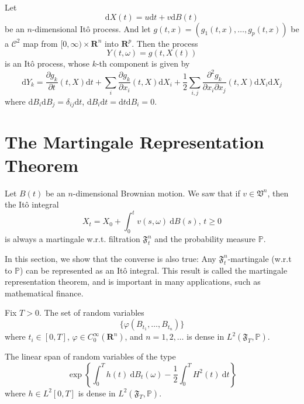 \begin{theorem}
    Let
    \[
        \mathrm{d}X(t) = u \mathrm{d}t + v \mathrm{d}B(t)
    \]
    be an $n$-dimensional Itô process. And let $g(t,x) = (g_1(t,x), \ldots, g_p(t,x))$ be a $\mathcal{C}^2$ map from $[0, \infty) \times \textbf{R}^n$ into $\textbf{R}^p$. Then the process 
    \[
        Y(t, \omega) = g(t, X(t))
    \]
    is an Itô process, whose $k$-th component is given by 
    \[
        \mathrm{d}Y_k = \frac{\partial g_k}{\partial t}(t, X) \mathrm{d}t + \sum_i \frac{\partial g_k}{\partial x_i}(t, X) \mathrm{d}X_i + \frac{1}{2} \sum_{i,j} \frac{\partial^2 g_k}{\partial x_i \partial x_j} (t,X) \mathrm{d}X_i \mathrm{d}X_j
    \]
    where $\mathrm{d}B_i \mathrm{d}B_j = \delta_{ij}\mathrm{d}t$, $\mathrm{d}B_i \mathrm{d}t = \mathrm{d}t \mathrm{d}B_i = 0$.
\end{theorem}

\section{The Martingale Representation Theorem}

Let $B(t)$ be an $n$-dimensional Brownian motion. We saw that if $v \in \mathfrak{V}^n$, then the Itô integral
\begin{equation*}
    X_t = X_0 + \int_0^t v(s, \omega) ~\mathrm{d}B(s), \, t \geq 0
\end{equation*}
is always a martingale w.r.t. filtration $\mathfrak{F}_t^n$ and the probability measure $\mathbb{P}$.

In this section, we show that the converse is also true: Any $\mathfrak{F}_t^n$-martingale (w.r.t to $\mathbb{P}$) can be represented as an Itô integral. This result is called the martingale representation theorem, and is important in many applications, such as mathematical finance.

\begin{lemma}
    Fix $T > 0$. The set of random variables 
    \[
        \{ \varphi(B_{t_1}, \ldots, B_{t_n}) \}
    \]
    where $t_i \in [0, T]$, $\varphi \in C_0^\infty(\textbf{R}^n)$, and $n = 1, 2, \ldots$ is dense in $L^2(\mathfrak{F}_T, \mathbb{P})$.
\end{lemma}

\begin{lemma}
    The linear span of random variables of the type
    \begin{equation*}
        \exp \left\{ \int_0^T h(t) ~\mathrm{d}B_t(\omega) - \frac{1}{2} \int_0^T H^2(t) ~\mathrm{d}t \right\}
    \end{equation*}
    where $h \in L^2[0,T]$ is dense in $L^2(\mathfrak{F}_T, \mathbb{P})$.
\end{lemma}

